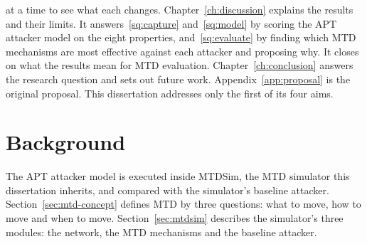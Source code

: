 \documentclass{cshonours}
\begin{document}
at a time to see what each changes. Chapter~\ref{ch:discussion} explains the
results and their limits. It answers~\ref{sq:capture} and~\ref{sq:model} by
scoring the APT attacker model on the eight properties, and~\ref{sq:evaluate}
by finding which MTD mechanisms are most effective against each attacker and
proposing why. It
closes on what the results mean for MTD evaluation.
Chapter~\ref{ch:conclusion} answers the research question and sets out
future work. Appendix~\ref{app:proposal} is the original proposal. This
dissertation addresses only the first of its four aims.

\chapter{Background}
\label{ch:background}


The APT attacker model is executed inside MTDSim, the MTD simulator this
dissertation inherits, and compared with the simulator's baseline attacker.
Section~\ref{sec:mtd-concept} defines MTD by three questions: what
to move, how to move and when to move.
Section~\ref{sec:mtdsim} describes the simulator's three modules: the
network, the MTD mechanisms and the baseline attacker.
\end{document}

